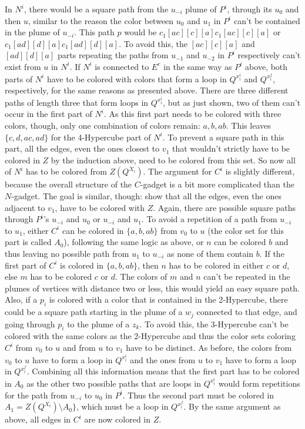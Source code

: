 \documentclass[12pt,a4paper]{article}
\begin{document}
In $N^i$, there would be a square path from the $u_{-i}$ plume of $P^i$, through its $u_0$ and then $u$, similar to the reason the color between $u_0$ and $u_1$ in $P^i$ can't be contained in the plume of $u_{-i}$. This path $p$ would be $c_1[ac][c][a]c_1[ac][c][a]$ or $c_1[ad][d][a]c_1[ad][d][a]$. To avoid this, the $[ac][c][a]$ and $[ad][d][a]$ parts repeating the paths from $u_{-1}$ and $u_{-2}$ in $P^i$ respectively can't exist from $u$ in $N^i$. If $N^i$ is connected to $E^e$ in the same way as $P^i$ above, both parts of $N^i$ have to be colored with colors that form a loop in $Q^{x^i_i}$ and $Q^{x^f_i}$, respectively, for the same reasons as presented above. There are three different paths of length three that form loops in $Q^{x^i_i}$, but as just shown, two of them can't occur in the first part of $N^i$. As this first part needs to be colored with three colors, though, only one combination of colors remain: ${a, b, ab}$. This leaves $ \{c, d, ac, ad \}$ for the 4-Hypercube part of $N^i$. To prevent a square path in this part, all the edges, even the ones closest to $v_1$ that wouldn't strictly have to be colored in $Z$ by the induction above, need to be colored from this set. So now all of $N^i$ has to be colored from $Z(Q^{X_i})$.
\newline
The argument for $C^i$ is slightly different, because the overall structure of the $C$-gadget is a bit more complicated than the $N$-gadget. The goal is similar, though: show that all the edges, even the ones adjacent to $v_1$, have to be colored with $Z$. Again, there are possible square paths through $P^i$'s $u_{-i}$ and $u_0$ or $u_{-i}$ and $u_1$. To avoid a repetition of a path from $u_{-i}$ to $u_1$, either $C^i$ can be colored in $ \{a, b, ab \}$ from $v_0$ to $u$ (the color set for this part is called $A_0$), following the same logic as above, or $n$ can be colored $b$ and thus leaving no possible path from $u_1$ to $u_{-i}$ as none of them contain $b$. If the first part of $C^i$ is colored in $ \{a, b, ab \}$, then $n$ has to be colored in either $c$ or $d$, else $m$ has to be colored $c$ or $d$. The colors of $m$ and $n$ can't be repeated in the plumes of vertices with distance two or less, this would yield an easy square path. Also, if a $p_i$ is colored with a color that is contained in the 2-Hypercube, there could be a square path starting in the plume of a $w_j$ connected to that edge, and going through $p_i$ to the plume of a $z_k$. To avoid this, the 3-Hypercube can't be colored with the same colors as the 2-Hypercube and thus the color sets coloring $C^i$ from $v_0$ to $u$ and from $u$ to $v_1$ have to be distinct. As before, the colors from $v_0$ to $u$ have to form a loop in $Q^{x^i_i}$ and the ones from $u$ to $v_1$ have to form a loop in $Q^{x^f_i}$. Combining all this information means that the first part has to be colored in $A_0$ as the other two possible paths that are loops in $Q^{x^i_i}$ would form repetitions for the path from $u_{-i}$ to $u_0$ in $P^i$. Thus the second part must be colored in $A_1 = Z(Q^{X_i}) \setminus A_0 \}$, which must be a loop in $Q^{x^f_i}$. By the same argument as above, all edges in $C^i$ are now colored in $Z$.
\end{document}
